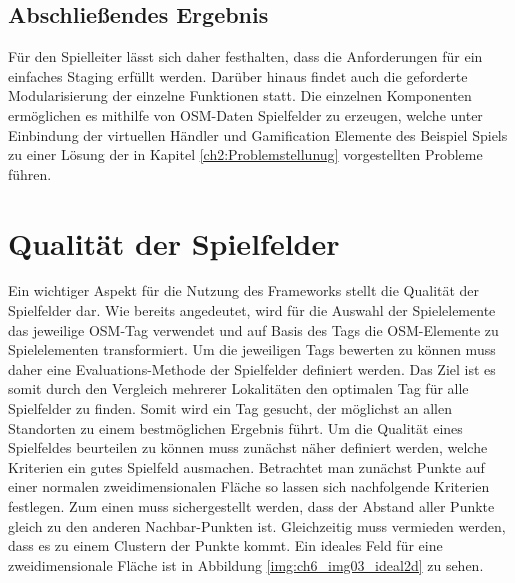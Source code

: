 \subsection*{Abschließendes Ergebnis}

Für den Spielleiter lässt sich daher festhalten, dass die Anforderungen für ein einfaches Staging erfüllt werden. Darüber hinaus findet auch die geforderte Modularisierung der einzelne Funktionen statt. Die einzelnen Komponenten ermöglichen es mithilfe von OSM-Daten Spielfelder zu erzeugen, welche unter Einbindung der virtuellen Händler und Gamification Elemente des Beispiel Spiels zu einer Lösung der in Kapitel \ref{ch2:Problemstellunug} vorgestellten Probleme führen.


\section{Qualität der Spielfelder}
\label{ch:CH6_qualtiy_of_gameboards}

Ein wichtiger Aspekt für die Nutzung des Frameworks stellt die Qualität der Spielfelder dar.
Wie bereits angedeutet, wird für die Auswahl der Spielelemente das jeweilige OSM-Tag verwendet und auf Basis des Tags die OSM-Elemente zu Spielelementen transformiert. Um die jeweiligen Tags bewerten zu können muss daher eine Evaluations-Methode der Spielfelder definiert werden.
Das Ziel ist es somit durch den Vergleich mehrerer Lokalitäten den optimalen Tag für alle Spielfelder zu finden. Somit wird ein Tag gesucht, der möglichst an allen Standorten zu einem bestmöglichen Ergebnis führt.
Um die Qualität eines Spielfeldes beurteilen zu können muss zunächst näher definiert werden, welche Kriterien ein gutes Spielfeld ausmachen. 
Betrachtet man zunächst Punkte auf einer normalen zweidimensionalen Fläche so lassen sich nachfolgende Kriterien festlegen.
Zum einen muss sichergestellt werden, dass der Abstand aller Punkte gleich zu den anderen Nachbar-Punkten ist. Gleichzeitig muss vermieden werden, dass es zu einem Clustern der Punkte kommt. Ein ideales Feld für eine zweidimensionale Fläche ist in Abbildung \ref{img:ch6_img03_ideal2d} zu sehen.

